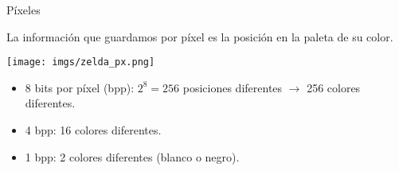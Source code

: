 \begin{frame}{Píxeles}
    \begin{block}{}
        La información que guardamos por píxel es la posición en la paleta de su color.
    \end{block}
    {\centering\texttt{[image: imgs/zelda\_px.png]}\\}
    \begin{itemize}
        \item<2-> 8 bits por píxel (bpp): $2^8=256$ posiciones diferentes $\rightarrow$ 256 colores diferentes.
        \item<3-> 4 bpp: 16 colores diferentes.
        \item<4-> 1 bpp: 2 colores diferentes (blanco o negro).
    \end{itemize}
\end{frame}


